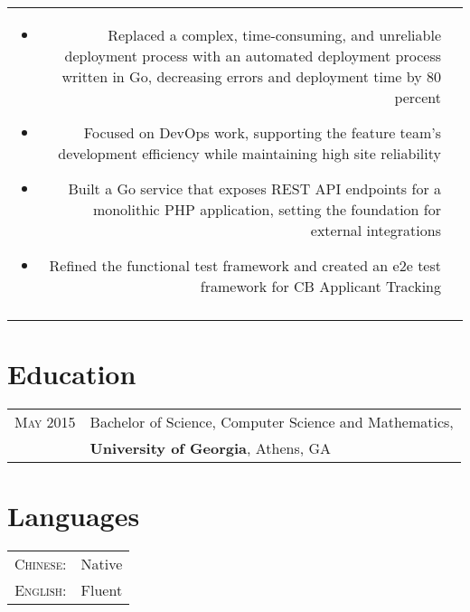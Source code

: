 \documentclass[a4paper,10pt]{article}
\begin{document}
\begin{tabular}{r|p{13cm}}
\begin{itemize}
   \item \footnotesize{Replaced a complex, time-consuming, and unreliable deployment process with an automated deployment process written in Go, decreasing errors and deployment time by 80 percent}
   \item \footnotesize{Focused on DevOps work, supporting the feature team's development efficiency while maintaining high site reliability}
   \item \footnotesize{Built a Go service that exposes REST API endpoints for a monolithic PHP application, setting the foundation for external integrations}
   \item \footnotesize{Refined the functional test framework and created an e2e test framework for CB Applicant Tracking}
 \end{itemize}
 \\
 \multicolumn{2}{c}{} \\
\end{tabular}

\section{Education}
\begin{tabular}{rl}	
 \textsc{May} 2015 & Bachelor of Science, Computer Science and Mathematics, \\ &
 \textbf{University of Georgia}, Athens, GA\\
\end{tabular}

\section{Languages}
\begin{tabular}{rl}
\textsc{Chinese:}&Native\\
\textsc{English:}&Fluent\\
\end{tabular}
\end{document}
